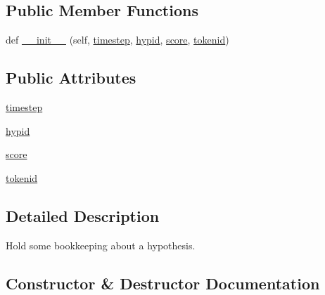 \subsection*{Public Member Functions}
\begin{DoxyCompactItemize}
\item 
def \hyperlink{classparlai_1_1core_1_1torch__generator__agent_1_1__HypothesisTail_a126c399a12a4e57d6dffaf78a27f129c}{\+\_\+\+\_\+init\+\_\+\+\_\+} (self, \hyperlink{classparlai_1_1core_1_1torch__generator__agent_1_1__HypothesisTail_a93efff1b214a2d98848f8b3d4bf59367}{timestep}, \hyperlink{classparlai_1_1core_1_1torch__generator__agent_1_1__HypothesisTail_a4957647a4492d6cdca0c2f61cce123d5}{hypid}, \hyperlink{classparlai_1_1core_1_1torch__generator__agent_1_1__HypothesisTail_a40f7d1630bf982c5206d8f3a86fd1d3c}{score}, \hyperlink{classparlai_1_1core_1_1torch__generator__agent_1_1__HypothesisTail_a354a80abd13b7da3fd1d116c639a4f1a}{tokenid})
\end{DoxyCompactItemize}
\subsection*{Public Attributes}
\begin{DoxyCompactItemize}
\item 
\hyperlink{classparlai_1_1core_1_1torch__generator__agent_1_1__HypothesisTail_a93efff1b214a2d98848f8b3d4bf59367}{timestep}
\item 
\hyperlink{classparlai_1_1core_1_1torch__generator__agent_1_1__HypothesisTail_a4957647a4492d6cdca0c2f61cce123d5}{hypid}
\item 
\hyperlink{classparlai_1_1core_1_1torch__generator__agent_1_1__HypothesisTail_a40f7d1630bf982c5206d8f3a86fd1d3c}{score}
\item 
\hyperlink{classparlai_1_1core_1_1torch__generator__agent_1_1__HypothesisTail_a354a80abd13b7da3fd1d116c639a4f1a}{tokenid}
\end{DoxyCompactItemize}


\subsection{Detailed Description}
\begin{DoxyVerb}Hold some bookkeeping about a hypothesis.
\end{DoxyVerb}
 

\subsection{Constructor \& Destructor Documentation}
\mbox{\label{classparlai_1_1core_1_1torch__generator__agent_1_1__HypothesisTail_a126c399a12a4e57d6dffaf78a27f129c}} 
